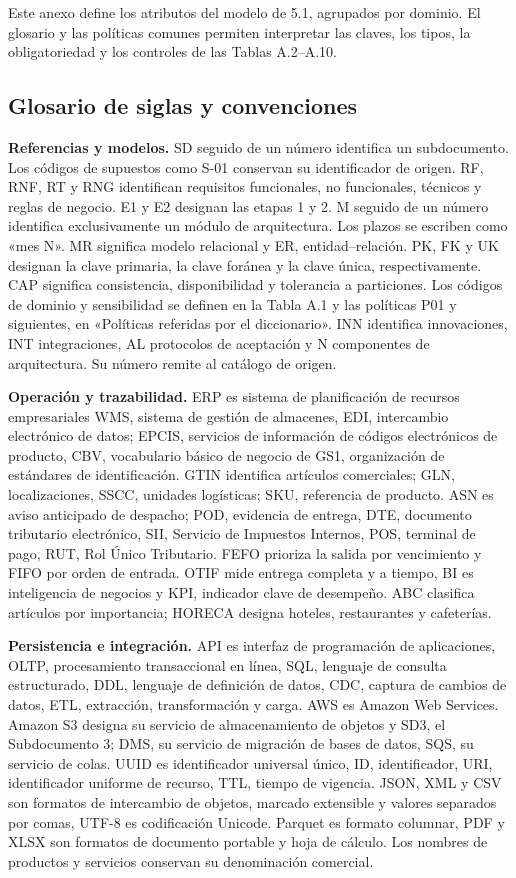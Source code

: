 Este anexo define los atributos del modelo de 5.1, agrupados por dominio. El glosario y las políticas comunes permiten interpretar las claves, los tipos, la obligatoriedad y los controles de las Tablas A.2–A.10.

\subsection*{Glosario de siglas y convenciones}

\textbf{Referencias y modelos.} SD seguido de un número identifica un subdocumento. Los códigos de supuestos como S-01 conservan su identificador de origen. RF, RNF, RT y RNG identifican requisitos funcionales, no funcionales, técnicos y reglas de negocio. E1 y E2 designan las etapas 1 y 2. M seguido de un número identifica exclusivamente un módulo de arquitectura. Los plazos se escriben como «mes N». MR significa modelo relacional y ER, entidad–relación. PK, FK y UK designan la clave primaria, la clave foránea y la clave única, respectivamente. CAP significa consistencia, disponibilidad y tolerancia a particiones. Los códigos de dominio y sensibilidad se definen en la Tabla A.1 y las políticas P01 y siguientes, en «Políticas referidas por el diccionario». INN identifica innovaciones, INT integraciones, AL protocolos de aceptación y N componentes de arquitectura. Su número remite al catálogo de origen.

\textbf{Operación y trazabilidad.} ERP es sistema de planificación de recursos empresariales WMS, sistema de gestión de almacenes, EDI, intercambio electrónico de datos; EPCIS, servicios de información de códigos electrónicos de producto, CBV, vocabulario básico de negocio de GS1, organización de estándares de identificación. GTIN identifica artículos comerciales; GLN, localizaciones, SSCC, unidades logísticas; SKU, referencia de producto. ASN es aviso anticipado de despacho; POD, evidencia de entrega, DTE, documento tributario electrónico, SII, Servicio de Impuestos Internos, POS, terminal de pago, RUT, Rol Único Tributario. FEFO prioriza la salida por vencimiento y FIFO por orden de entrada. OTIF mide entrega completa y a tiempo, BI es inteligencia de negocios y KPI, indicador clave de desempeño. ABC clasifica artículos por importancia; HORECA designa hoteles, restaurantes y cafeterías.

\textbf{Persistencia e integración.} API es interfaz de programación de aplicaciones, OLTP, procesamiento transaccional en línea, SQL, lenguaje de consulta estructurado, DDL, lenguaje de definición de datos, CDC, captura de cambios de datos, ETL, extracción, transformación y carga. AWS es Amazon Web Services. Amazon S3 designa su servicio de almacenamiento de objetos y SD3, el Subdocumento 3; DMS, su servicio de migración de bases de datos, SQS, su servicio de colas. UUID es identificador universal único, ID, identificador, URI, identificador uniforme de recurso, TTL, tiempo de vigencia. JSON, XML y CSV son formatos de intercambio de objetos, marcado extensible y valores separados por comas, UTF-8 es codificación Unicode. Parquet es formato columnar, PDF y XLSX son formatos de documento portable y hoja de cálculo. Los nombres de productos y servicios conservan su denominación comercial.

